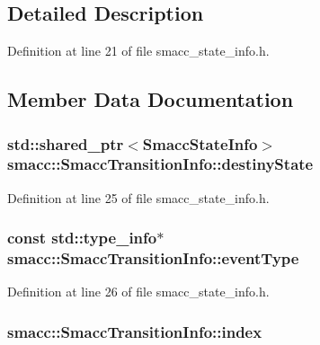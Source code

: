 \subsection{Detailed Description}


Definition at line 21 of file smacc\+\_\+state\+\_\+info.\+h.



\subsection{Member Data Documentation}
\subsubsection[{\texorpdfstring{destiny\+State}{destinyState}}]{\setlength{\rightskip}{0pt plus 5cm}std\+::shared\+\_\+ptr$<${\bf Smacc\+State\+Info}$>$ smacc\+::\+Smacc\+Transition\+Info\+::destiny\+State}\hypertarget{structsmacc_1_1SmaccTransitionInfo_a3deee8ced495b363eeca7f0e53d9a5af}{}\label{structsmacc_1_1SmaccTransitionInfo_a3deee8ced495b363eeca7f0e53d9a5af}


Definition at line 25 of file smacc\+\_\+state\+\_\+info.\+h.

\subsubsection[{\texorpdfstring{event\+Type}{eventType}}]{\setlength{\rightskip}{0pt plus 5cm}const std\+::type\+\_\+info$\ast$ smacc\+::\+Smacc\+Transition\+Info\+::event\+Type}\hypertarget{structsmacc_1_1SmaccTransitionInfo_aed5d6efa53816d840b1f7e254ebb6134}{}\label{structsmacc_1_1SmaccTransitionInfo_aed5d6efa53816d840b1f7e254ebb6134}


Definition at line 26 of file smacc\+\_\+state\+\_\+info.\+h.

\subsubsection[{\texorpdfstring{index}{index}}]{ smacc\+::\+Smacc\+Transition\+Info\+::index}\hypertarget{structsmacc_1_1SmaccTransitionInfo_a629160558f789d6812c7edd54707e053}{}\label{structsmacc_1_1SmaccTransitionInfo_a629160558f789d6812c7edd54707e053}


